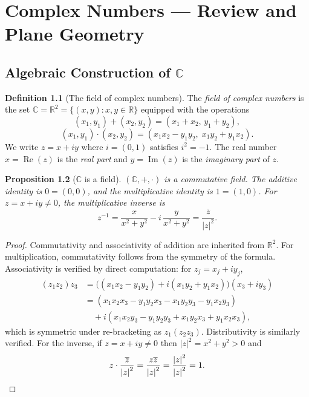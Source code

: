 \documentclass[12pt,a4paper,openany]{book}
\theoremstyle{definition}
\newtheorem{definition}{Definition}[chapter]
\theoremstyle{plain}
\newtheorem{proposition}[definition]{Proposition}
\theoremstyle{remark}
\newcommand{\C}{\mathbb{C}}
\newcommand{\R}{\mathbb{R}}
\DeclareMathOperator{\re}{Re}
\DeclareMathOperator{\im}{Im}
\newcommand{\abs}[1]{\left|#1\right|}
\newcommand{\conj}[1]{\overline{#1}}
\begin{document}
\mainmatter

\chapter{Complex Numbers --- Review and Plane Geometry}
\label{ch:complex-numbers}

\section{Algebraic Construction of \texorpdfstring{$\C$}{C}}
\label{sec:construction-C}

\begin{definition}[The field of complex numbers]
\label{def:complex-field}
The \emph{field of complex numbers} is the set $\C = \R^2 = \{(x,y) : x,y\in\R\}$ equipped with the operations
\[
  (x_1,y_1)+(x_2,y_2) = (x_1+x_2,\, y_1+y_2),
\]
\[
  (x_1,y_1)\cdot(x_2,y_2) = (x_1 x_2 - y_1 y_2,\; x_1 y_2 + y_1 x_2).
\]
We write $z = x + iy$ where $i = (0,1)$ satisfies $i^2 = -1$. The real number $x = \re(z)$ is the \emph{real part} and $y = \im(z)$ is the \emph{imaginary part} of $z$.
\end{definition}

\begin{proposition}[$\C$ is a field]
\label{prop:C-field}
$(\C,+,\cdot)$ is a commutative field. The additive identity is $0=(0,0)$, and the multiplicative identity is $1=(1,0)$. For $z=x+iy\neq 0$, the multiplicative inverse is
\[
  z^{-1} = \frac{x}{x^2+y^2} - i\,\frac{y}{x^2+y^2} = \frac{\conj{z}}{\abs{z}^2}.
\]
\end{proposition}

\begin{proof}
Commutativity and associativity of addition are inherited from $\R^2$. For multiplication, commutativity follows from the symmetry of the formula. Associativity is verified by direct computation: for $z_j = x_j+iy_j$,
\begin{align*}
(z_1 z_2)z_3 &= \bigl((x_1x_2-y_1y_2)+i(x_1y_2+y_1x_2)\bigr)(x_3+iy_3)\\
&= (x_1x_2x_3 - y_1y_2x_3 - x_1y_2y_3 - y_1x_2y_3) \\
&\quad + i(x_1x_2y_3 - y_1y_2y_3 + x_1y_2x_3 + y_1x_2x_3),
\end{align*}
which is symmetric under re-bracketing as $z_1(z_2 z_3)$. Distributivity is similarly verified. For the inverse, if $z = x+iy\neq 0$ then $\abs{z}^2 = x^2+y^2 > 0$ and
\[
  z \cdot \frac{\conj{z}}{\abs{z}^2} = \frac{z\conj{z}}{\abs{z}^2} = \frac{\abs{z}^2}{\abs{z}^2} = 1. \qedhere
\]
\end{proof}
\end{document}
